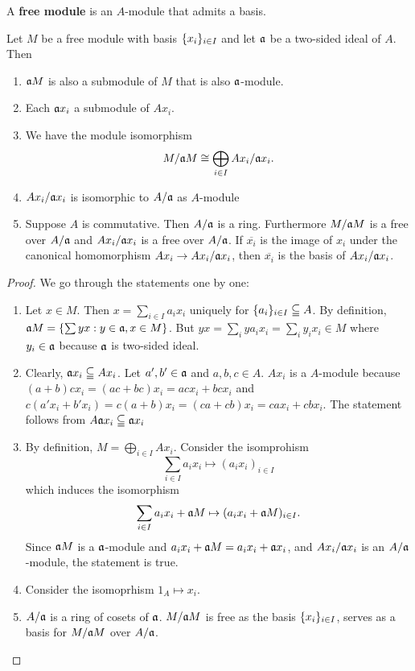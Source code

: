     \begin{definition}
        A \textbf{free module} is an $A$-module that admits a basis. 
    \end{definition}

    \begin{proposition}
        Let $M$ be a free module with basis $\{x_i\}_{i \in I}$ and let $\mathfrak{a}$ be a two-sided ideal of $A$. Then 
        \begin{enumerate} 
        \item $\mathfrak{a} M$ is also a submodule of $M$ that is also $\mathfrak{a}$-module.
        \item Each $\mathfrak{a} x_i$ a submodule of $Ax_i$.
        \item We have the module isomorphism 
        $$M/\mathfrak{a}  M \cong  \bigoplus_{i \in I} Ax_i/\mathfrak{a} x_i.$$
        \item $Ax_i/\mathfrak{a}x_i$ is isomorphic to $A/\mathfrak{a}$ as $A$-module
        \item Suppose $A$ is commutative. Then $A/\mathfrak{a}$ is a ring. Furthermore $M/\mathfrak{a}M$ is a free over $A/\mathfrak{a}$ and $Ax_i/\mathfrak{a}x_i$ is a free over $A/\mathfrak{a}$. If $\overline{x_i}$ is the image of $x_i$ under the canonical homomorphism $Ax_i \to Ax_i/\mathfrak{a} x_i$, then $\overline{x_i}$ is the basis of $Ax_i/\mathfrak{a}x_i$.
    \end{enumerate}
    \end{proposition}
    \begin{proof}
        We go through the statements one by one:
        \begin{enumerate}
            \item Let $x \in M$. Then $x = \sum_{i \in I} a_ix_i$ uniquely for $\{a_i\}_{i\in I} \subseteqq A$. By definition, $\mathfrak{a} M = \{\sum yx : y \in \mathfrak{a}, x  \in M\}$. But $yx = \sum_i ya_ix_i = \sum_i y_ix_i \in M$ where $y_i \in \mathfrak{a}$ because $\mathfrak{a}$ is two-sided ideal.
            
            \item Clearly, $\mathfrak{a} x_i \subseteqq Ax_i$. Let $a', b' \in \mathfrak{a}$ and $a, b, c \in A$.  $Ax_i$ is a $A$-module because $(a + b)cx_i = (ac + bc)x_i = acx_i + bcx_i$ and $c(a'x_i + b'x_i) = c(a + b)x_i = (ca + cb)x_i = cax_i + cbx_i.$ The statement follows from $A\mathfrak{a} x_i \subseteqq \mathfrak{a} x_i$
            
            \item By definition, $M = \bigoplus_{i \in I} Ax_i$. Consider the isomprohism 
            $$\sum_{i \in I} a_ix_i \mapsto (a_ix_i)_{i \in I}$$
            which induces the isomorphism
            $$\sum_{i \in I} a_ix_i + \mathfrak{a} M \mapsto  (a_ix_i + \mathfrak{a}M)_{i \in I}.$$
            Since $\mathfrak{a}M$ is a $\mathfrak{a}$-module and  $a_ix_i+ \mathfrak{a}M = a_ix_i + \mathfrak{a} x_i$, and $Ax_i/\mathfrak{a} x_i$ is an $A/\mathfrak{a}$-module, the statement is true.

            \item Consider the isomoprhism $1_A \mapsto  x_i.$
            \item $A/\mathfrak{a}$ is a ring of cosets of $\mathfrak{a}$.  $M/\mathfrak{a}M$ is free as the basis $\{x_i\}_{i \in I}$,  serves as a basis for $M/\mathfrak{a}M$ over $A/\mathfrak{a}$.                
        \end{enumerate}
    \end{proof}

